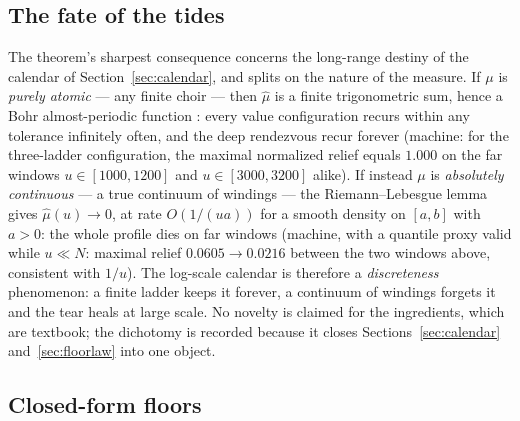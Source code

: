 \documentclass[11pt,a4paper]{article}
\begin{document}
\subsection{The fate of the tides}
\label{sec:tides}

The theorem's sharpest consequence concerns the long-range destiny of
the calendar of Section~\ref{sec:calendar}, and splits on the nature of
the measure. If $\mu$ is \emph{purely atomic} --- any finite choir ---
then $\hat{\mu}$ is a finite trigonometric sum, hence a Bohr
almost-periodic function \cite{Bohr1947}: every value configuration
recurs within any tolerance infinitely often, and the deep rendezvous
recur forever (machine: for the three-ladder configuration, the maximal
normalized relief equals $1.000$ on the far windows $u \in [1000,1200]$
and $u \in [3000,3200]$ alike). If instead $\mu$ is \emph{absolutely
continuous} --- a true continuum of windings --- the Riemann--Lebesgue
lemma gives $\hat{\mu}(u) \to 0$, at rate $O(1/(ua))$ for a smooth
density on $[a,b]$ with $a > 0$: the whole profile dies on far windows
(machine, with a quantile proxy valid while $u \ll N$: maximal relief
$0.0605 \to 0.0216$ between the two windows above, consistent with
$1/u$). The log-scale calendar is therefore a \emph{discreteness}
phenomenon: a finite ladder keeps it forever, a continuum of windings
forgets it and the tear heals at large scale. No novelty is claimed for
the ingredients, which are textbook; the dichotomy is recorded because
it closes Sections~\ref{sec:calendar} and~\ref{sec:floorlaw} into one
object.

\subsection{Closed-form floors}
\label{sec:closedfloors}
\end{document}
